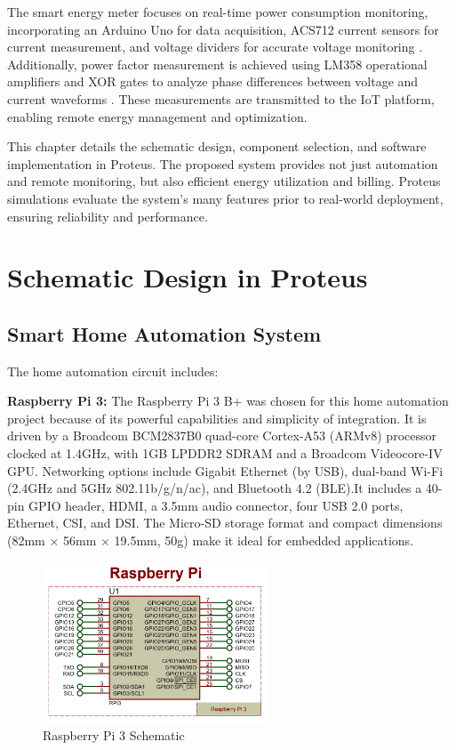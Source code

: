 \documentclass[a4paper,12pt]{report}
\begin{document}
The smart energy meter focuses on real-time power consumption monitoring, incorporating an Arduino Uno for data acquisition, ACS712 current sensors for current measurement, and voltage dividers for accurate voltage monitoring \cite{li2010application}. Additionally, power factor measurement is achieved using LM358 operational amplifiers and XOR gates to analyze phase differences between voltage and current waveforms \cite{Khair_2017}. These measurements are transmitted to the IoT platform, enabling remote energy management and optimization.

This chapter details the schematic design, component selection, and software implementation in Proteus.  The proposed system provides not just automation and remote monitoring, but also efficient energy utilization and billing.  Proteus simulations evaluate the system's many features prior to real-world deployment, ensuring reliability and performance.

\section{Schematic Design in Proteus}
\subsection{Smart Home Automation System}
The home automation circuit includes:

\textbf{Raspberry Pi 3:} The Raspberry Pi 3 B+ was chosen for this home automation project because of its powerful capabilities and simplicity of integration.  It is driven by a Broadcom BCM2837B0 quad-core Cortex-A53 (ARMv8) processor clocked at 1.4GHz, with 1GB LPDDR2 SDRAM and a Broadcom Videocore-IV GPU. Networking options include Gigabit Ethernet (by USB), dual-band Wi-Fi (2.4GHz and 5GHz 802.11b/g/n/ac), and Bluetooth 4.2 (BLE)\cite{valov2020home}.It includes a 40-pin GPIO header, HDMI, a 3.5mm audio connector, four USB 2.0 ports, Ethernet, CSI, and DSI.  The Micro-SD storage format and compact dimensions (82mm × 56mm × 19.5mm, 50g) make it ideal for embedded applications\cite{valov2020home}.

\begin{figure}[H]  %
    \centering
    \includegraphics[width=0.6\textwidth]{image.png} %
    \caption{Raspberry Pi 3 Schematic}
    \label{fig:Raspberry} %
\end{figure}
\end{document}
